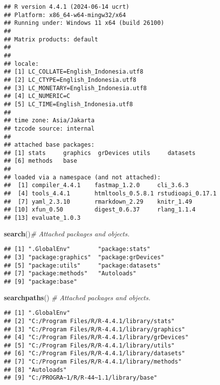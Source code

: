 \documentclass[
]{article}
\newenvironment{Shaded}{\begin{snugshade}}{\end{snugshade}}
\newcommand{\CommentTok}[1]{\textcolor[rgb]{0.56,0.35,0.01}{\textit{#1}}}
\newcommand{\FunctionTok}[1]{\textcolor[rgb]{0.13,0.29,0.53}{\textbf{#1}}}
\newcommand{\NormalTok}[1]{#1}
\begin{document}
\begin{verbatim}
## R version 4.4.1 (2024-06-14 ucrt)
## Platform: x86_64-w64-mingw32/x64
## Running under: Windows 11 x64 (build 26100)
## 
## Matrix products: default
## 
## 
## locale:
## [1] LC_COLLATE=English_Indonesia.utf8 
## [2] LC_CTYPE=English_Indonesia.utf8   
## [3] LC_MONETARY=English_Indonesia.utf8
## [4] LC_NUMERIC=C                      
## [5] LC_TIME=English_Indonesia.utf8    
## 
## time zone: Asia/Jakarta
## tzcode source: internal
## 
## attached base packages:
## [1] stats     graphics  grDevices utils     datasets 
## [6] methods   base     
## 
## loaded via a namespace (and not attached):
##  [1] compiler_4.4.1    fastmap_1.2.0     cli_3.6.3        
##  [4] tools_4.4.1       htmltools_0.5.8.1 rstudioapi_0.17.1
##  [7] yaml_2.3.10       rmarkdown_2.29    knitr_1.49       
## [10] xfun_0.50         digest_0.6.37     rlang_1.1.4      
## [13] evaluate_1.0.3
\end{verbatim}

\begin{Shaded}
\begin{Highlighting}[]
\FunctionTok{search}\NormalTok{()}\CommentTok{\# Attached packages and objects.}
\end{Highlighting}
\end{Shaded}

\begin{verbatim}
## [1] ".GlobalEnv"        "package:stats"    
## [3] "package:graphics"  "package:grDevices"
## [5] "package:utils"     "package:datasets" 
## [7] "package:methods"   "Autoloads"        
## [9] "package:base"
\end{verbatim}

\begin{Shaded}
\begin{Highlighting}[]
\FunctionTok{searchpaths}\NormalTok{() }\CommentTok{\# Attached packages and objects.}
\end{Highlighting}
\end{Shaded}

\begin{verbatim}
## [1] ".GlobalEnv"                                  
## [2] "C:/Program Files/R/R-4.4.1/library/stats"    
## [3] "C:/Program Files/R/R-4.4.1/library/graphics" 
## [4] "C:/Program Files/R/R-4.4.1/library/grDevices"
## [5] "C:/Program Files/R/R-4.4.1/library/utils"    
## [6] "C:/Program Files/R/R-4.4.1/library/datasets" 
## [7] "C:/Program Files/R/R-4.4.1/library/methods"  
## [8] "Autoloads"                                   
## [9] "C:/PROGRA~1/R/R-44~1.1/library/base"
\end{verbatim}
\end{document}
